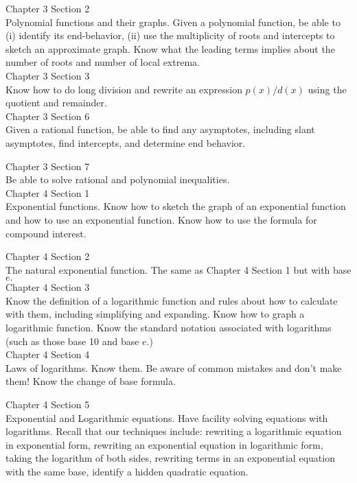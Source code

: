 \documentclass[11pt]{article}
\begin{document}
Chapter 3 Section 2\\
Polynomial functions and their graphs. Given a polynomial function, be able to (i) identify its end-behavior, (ii) use the multiplicity of roots and intercepts to sketch an approximate graph. Know what the leading terms implies about the number of roots and number of local extrema.\\


Chapter 3 Section 3\\
Know how to do long division and rewrite an expression $p(x)/d(x)$  using the quotient and remainder.\\

Chapter 3 Section 6\\
Given a rational function, be able to find any asymptotes, including slant asymptotes, find intercepts, and determine end behavior.\\
\newpage

Chapter 3 Section 7\\
Be able to solve rational and polynomial inequalities.\\

Chapter 4 Section 1\\
Exponential functions. Know how to sketch the graph of an exponential function and how to use an exponential function. Know how to use the formula for compound interest.

Chapter 4 Section 2\\
The natural exponential function. The same as Chapter 4 Section 1 but with base $e.$\\

Chapter 4 Section 3\\
Know the definition of a logarithmic function and rules about how to calculate with them, including simplifying and expanding. Know how to graph a logarithmic function. Know the standard notation associated with logarithms (such as those base 10 and base $e.$)\\

Chapter 4 Section 4\\
Laws of logarithms. Know them. Be aware of common mistakes and don't make them! Know the change of base formula.

Chapter 4 Section 5\\
Exponential and Logarithmic equations. Have facility solving equations with logarithms. Recall that our techniques include: rewriting a logarithmic equation in exponential form, rewriting an exponential equation in logarithmic form, taking the logarithm of both sides, rewriting terms in an exponential equation with the same base, identify a hidden quadratic equation.\\
\end{document}
